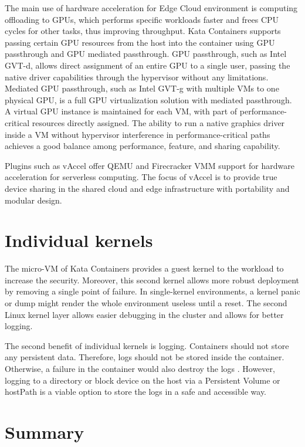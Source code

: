 The main use of hardware acceleration for Edge Cloud environment is computing offloading to GPUs, which performs specific workloads faster and frees CPU cycles for other tasks, thus improving throughput. Kata Containers supports passing certain GPU resources from the host into the container using GPU passthrough and GPU mediated passthrough. GPU passthrough, such as Intel GVT-d, allows direct assignment of an entire GPU to a single user, passing the native driver capabilities through the hypervisor without any limitations. Mediated GPU passthrough, such as Intel GVT-g with multiple VMs to one physical GPU, is a full GPU virtualization solution with mediated passthrough. A virtual GPU instance is maintained for each VM, with part of performance-critical resources directly assigned. The ability to run a native graphics driver inside a VM without hypervisor interference in performance-critical paths achieves a good balance among performance, feature, and sharing capability. \cite{GPUKataContainers}

Plugins such as vAccel \cite{vAccel} offer QEMU and Firecracker VMM support for hardware acceleration for serverless computing. The focus of vAccel is to provide true device sharing in the shared cloud and edge infrastructure with portability and modular design.
		
\section{Individual kernels}

The micro-VM of Kata Containers provides a guest kernel to the workload to increase the security. Moreover, this second kernel allows more robust deployment by removing a single point of failure. In single-kernel environments, a kernel panic or dump might render the whole environment useless until a reset. The second Linux kernel layer allows easier debugging in the cluster and allows for better logging.

The second benefit of individual kernels is logging. Containers should not store any persistent data. Therefore, logs should not be stored inside the container. Otherwise, a failure in the container would also destroy the logs \cite{Toimela2017}. However, logging to a directory or block device on the host via a Persistent Volume or hostPath is a viable option to store the logs in a safe and accessible way.

\section{Summary}

